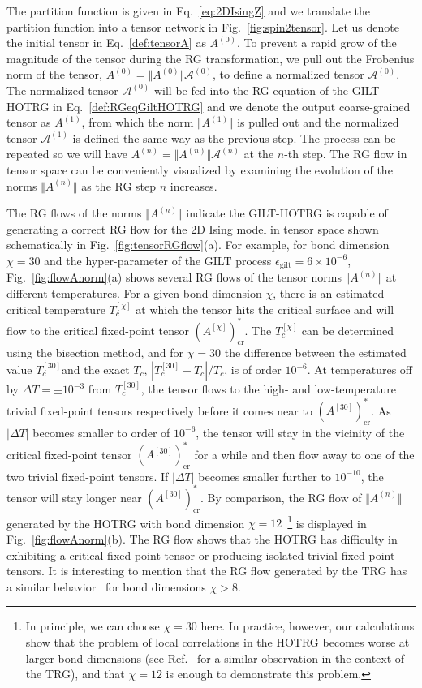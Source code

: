\documentclass[aps,prr,reprint,superscriptaddress,floatfix]{revtex4-2}
\begin{document}
The partition function is given in Eq.~\eqref{eq:2DIsingZ} and we translate the partition function into a tensor network in Fig.~\ref{fig:spin2tensor}. 
Let us denote the initial tensor in Eq.~\eqref{def:tensorA} as $A^{(0)}$. 
To prevent a rapid grow of the magnitude of the tensor during the RG transformation, we pull out the Frobenius norm of the tensor, $A^{(0)} = \Vert A^{(0)}\Vert \mathcal{A}^{(0)}$, to define a normalized tensor $\mathcal{A}^{(0)}$. 
The normalized tensor $\mathcal{A}^{(0)}$ will be fed into the RG equation of the GILT-HOTRG in Eq.~\eqref{def:RGeqGiltHOTRG} and we denote the output coarse-grained tensor as $A^{(1)}$, from which the norm $\Vert A^{(1)}\Vert$ is pulled out and the normalized tensor $\mathcal{A}^{(1)}$ is defined the same way as the previous step. 
The process can be repeated so we will have $A^{(n)} = \Vert A^{(n)}\Vert \mathcal{A}^{(n)}$ at the $n$-th step. 
The RG flow in tensor space can be conveniently visualized by examining the evolution of the norms $\Vert A^{(n)}\Vert$ as the RG step $n$ increases.
%

The RG flows of the norms $\Vert A^{(n)} \Vert$ indicate the GILT-HOTRG is capable of generating a correct RG flow for the 2D Ising model in tensor space shown schematically in Fig.~\ref{fig:tensorRGflow}(a). 
For example, for bond dimension $\chi = 30$ and the hyper-parameter of the GILT process $\epsilon_{\text{gilt}} = 6\times 10^{-6}$, Fig.~\ref{fig:flowAnorm}(a) shows several RG flows of the tensor norms $\Vert A^{(n)} \Vert$ at different temperatures. 
For a given bond dimension $\chi$, there is an estimated critical temperature $T_c^{[\chi]}$ at which the tensor hits the critical surface and will flow to the critical fixed-point tensor $(A^{[\chi]})^*_{\text{cr}}$. 
The $T_c^{[\chi]}$ can be determined using the bisection method, and for $\chi = 30$ the difference between the estimated value $T_c^{[30]}$and the exact $T_c$, $|T_c^{[30]} - T_c| / T_c$, is of order $10^{-6}$. 
At temperatures off by $\Delta T = \pm 10^{-3}$ from $T_c^{[30]}$, the tensor flows to the high- and low-temperature trivial fixed-point tensors respectively before it comes near to $(A^{[30]})^*_{\text{cr}}$. 
As $|\Delta T|$ becomes smaller to order of $10^{-6}$, the tensor will stay in the vicinity of the critical fixed-point tensor $(A^{[30]})^*_{\text{cr}}$ for a while and then flow away to one of the two trivial fixed-point tensors. 
If $|\Delta T|$ becomes smaller further to $10^{-10}$, the tensor will stay longer near $(A^{[30]})^*_{\text{cr}}$. 
By comparison, the RG flow of $\Vert A^{(n)}\Vert$ generated by the HOTRG with bond dimension $\chi = 12$~\footnote{In principle, we can choose $\chi = 30$ here. In practice, however, our calculations show that the problem of local correlations in the HOTRG becomes worse at larger bond dimensions (see Ref.~\cite{Berker2008} for a similar observation in the context of the TRG), and that $\chi = 12$ is enough to demonstrate this problem.} is displayed in Fig.~\ref{fig:flowAnorm}(b). 
The RG flow shows that the HOTRG has difficulty in exhibiting a critical fixed-point tensor or producing isolated trivial fixed-point tensors. 
It is interesting to mention that the RG flow generated by the TRG has a similar behavior~\cite{Berker2008} for bond dimensions $\chi > 8$.
%
\end{document}
